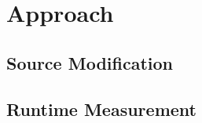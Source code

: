 \section{Approach}
\label{sec:approach}

\subsection{Source Modification}
\subsection{Runtime Measurement}